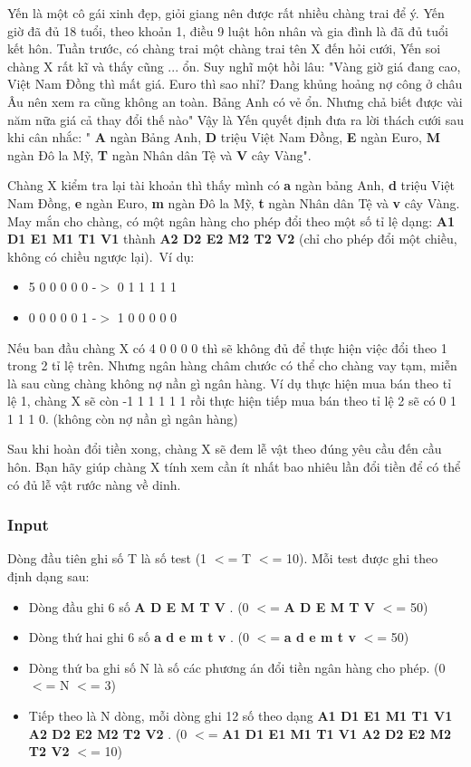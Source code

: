 

Yến là một cô gái xinh đẹp, giỏi giang nên được rất nhiều chàng trai để ý. Yến giờ đã đủ 18 tuổi, theo khoản 1, điều 9 luật hôn nhân và gia đình là đã đủ tuổi kết hôn. Tuần trước, có chàng trai một chàng trai tên X đến hỏi cưới, Yến soi chàng X rất kĩ và thấy cũng ... ổn. Suy nghĩ một hồi lâu: "Vàng giờ giá đang cao, Việt Nam Đồng thì mất giá. Euro thì sao nhỉ? Đang khủng hoảng nợ công ở châu Âu nên xem ra cũng không an toàn. Bảng Anh có vẻ ổn. Nhưng chả biết được vài năm nữa giá cả thay đổi thế nào" Vậy là Yến quyết định đưa ra lời thách cưới sau khi cân nhắc: " \textbf{ A } ngàn Bảng Anh, \textbf{ D } triệu Việt Nam Đồng, \textbf{ E } ngàn Euro, \textbf{ M } ngàn Đô la Mỹ, \textbf{ T } ngàn Nhân dân Tệ và \textbf{ V } cây Vàng".

Chàng X kiểm tra lại tài khoản thì thấy mình có \textbf{ a } ngàn bảng Anh, \textbf{ d } triệu Việt Nam Đồng, \textbf{ e } ngàn Euro, \textbf{ m } ngàn Đô la Mỹ, \textbf{ t } ngàn Nhân dân Tệ và \textbf{ v } cây Vàng. May mắn cho chàng, có một ngân hàng cho phép đổi theo một số tỉ lệ dạng: \textbf{ A1 D1 E1 M1 T1 V1 } thành \textbf{ A2 D2 E2 M2 T2 V2 } (chỉ cho phép đổi một chiều, không có chiều ngược lại). Ví dụ:
\begin{itemize}
	\item 5 0 0 0 0 0 -$>$ 0 1 1 1 1 1
	\item 0 0 0 0 0 1 -$>$ 1 0 0 0 0 0
\end{itemize}

Nếu ban đầu chàng X có 4 0 0 0 0 thì sẽ không đủ để thực hiện việc đổi theo 1 trong 2 tỉ lệ trên. Nhưng ngân hàng châm chước có thể cho chàng vay tạm, miễn là sau cùng chàng không nợ nần gì ngân hàng. Ví dụ thực hiện mua bán theo tỉ lệ 1, chàng X sẽ còn -1 1 1 1 1 1 rồi thực hiện tiếp mua bán theo tỉ lệ 2 sẽ có 0 1 1 1 1 0. (không còn nợ nần gì ngân hàng)

Sau khi hoàn đổi tiền xong, chàng X sẽ đem lễ vật theo đúng yêu cầu đến cầu hôn. Bạn hãy giúp chàng X tính xem cần ít nhất bao nhiêu lần đổi tiền để có thể có đủ lễ vật rước nàng về dinh.

\subsubsection{Input}

Dòng đầu tiên ghi số T là số test (1 $<$= T $<$= 10). Mỗi test được ghi theo định dạng sau:
\begin{itemize}
	\item Dòng đầu ghi 6 số \textbf{ A D E M T V } . (0 $<$= \textbf{ A D E M T V } $<$= 50)
	\item Dòng thứ hai ghi 6 số \textbf{ a d e m t v } . (0 $<$= \textbf{ a d e m t v } $<$= 50)
	\item Dòng thứ ba ghi số N là số các phương án đổi tiền ngân hàng cho phép. (0 $<$= N $<$= 3)
	\item Tiếp theo là N dòng, mỗi dòng ghi 12 số theo dạng \textbf{ A1 D1 E1 M1 T1 V1 A2 D2 E2 M2 T2 V2 } . (0 $<$= \textbf{ A1 D1 E1 M1 T1 V1 A2 D2 E2 M2 T2 V2 } $<$= 10)
\end{itemize}

